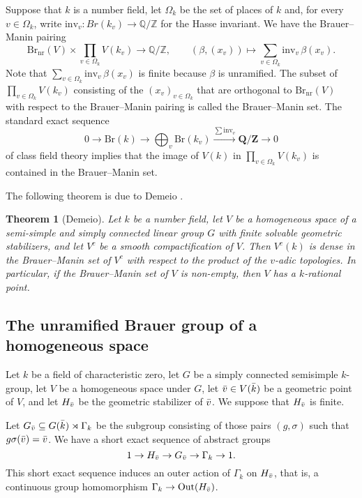 \documentclass[10pt,letterpaper,twoside]{article}
\renewcommand{\1}{\mathbf{1}}
\newcommand{\bQ}{\mathbf{Q}}
\newcommand{\bZ}{\mathbf{Z}}
\newcommand{\inv}{\mathrm{inv}}
\newcommand{\nr}{\mathrm{nr}}
\newcommand{\Br}{\mathrm{Br}}
\theoremstyle{plain}
\newtheorem{theorem}{Theorem}[section]
\theoremstyle{plain}
\theoremstyle{definition}
\theoremstyle{named}
\theoremstyle{definition}
\begin{document}
	Suppose that $k$ is a number field, let $\Omega_k$ be the set of places of $k$ and, for every $v \in \Omega_k$, write $\text{inv}_v: Br(k_v) \to \mathbb{Q}/\mathbb{Z}$ for the Hasse invariant. We have the Brauer--Manin pairing
	\[
	\Br_\nr(V) \times \prod_{v \in \Omega_k} V(k_v) \to \mathbb{Q}/\mathbb{Z}, \qquad (\beta, (x_v)) \mapsto \sum_{v \in \Omega_k} \text{inv}_v \, \beta(x_v).
	\]
	Note that $\sum_{v \in \Omega_k} \text{inv}_v \, \beta(x_v)$ is finite because $\beta$ is
	unramified. The subset of $\prod_{v \in \Omega_k} V(k_v)$ consisting of the $(x_v)_{v\in \Omega_k}$
	that are orthogonal to $\Br_\nr(V)$ with respect to the Brauer--Manin pairing is called the
	Brauer--Manin set. The standard exact sequence
	$$0\rightarrow\Br(k)\rightarrow\bigoplus_v\Br(k_v)\xrightarrow{\sum\inv_v}\bQ/\bZ\rightarrow 0$$ of class field theory implies that the image of $V(k)$ in $\prod_{v \in \Omega_k} V(k_v)$ is contained in the Brauer--Manin set.
	
	The following theorem is due to Demeio \cite{}.
	
	\begin{theorem}[Demeio]
		Let $k$ be a number field, let $V$ be a homogeneous space of a semi-simple and simply connected
		linear group $G$ with finite solvable geometric stabilizers, and let $V^c$ be a smooth
		compactification of $V$. Then $V^c(k)$ is dense in the Brauer–Manin set of $V^c$ with respect to
		the product of the $v$-adic topologies. In particular, if the Brauer--Manin set of $V$ is
		non-empty, then $V$ has a $k$-rational point.
	\end{theorem}
	
	
	
	
	\subsection{The unramified Brauer group of a homogeneous space}
	Let $k$ be a field of characteristic zero, let $G$ be a simply connected semisimple $k$-group, let $V$ be a homogeneous space under $G$, let $\Bar{v}\in V(\Bar{k})$ be a geometric point of $V$, and let $H_{\Bar{v}}$ be the geometric stabilizer of $\Bar{v}$. We suppose that $H_{\Bar{v}}$ is finite.
	
	Let $G_{\Bar{v}} \subseteq G(\Bar{k}) \rtimes \Gamma_k$ be the subgroup consisting of those pairs $(g, \sigma)$ such that $g\sigma(\Bar{v}) = \Bar{v}$. We have a short exact sequence of abstract groups
	\[
	1 \to H_{\Bar{v}} \to G_{\Bar{v}} \to \Gamma_k \to 1.
	\]
	This short exact sequence induces an outer action of $\Gamma_k$ on $H_{\Bar{v}}$, that is, a continuous group homomorphism $\Gamma_k\to \mathrm{Out}(H_{\Bar{v}})$. 
	
\end{document}
